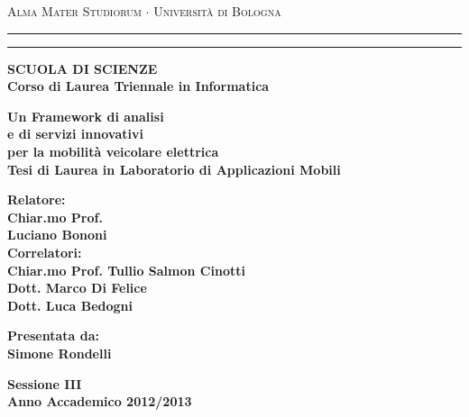  \begin{titlepage}
    \begin{center}
      {{\Large{\textsc{Alma Mater Studiorum $\cdot$ Universit\`a di Bologna}}}} \rule[0.1cm]{15.8cm}{0.1mm}
      \rule[0.5cm]{15.8cm}{0.6mm}
      {\small{\bf SCUOLA DI SCIENZE\\
      Corso di Laurea Triennale in Informatica }}
    \end{center}
    
    \vspace{15mm}
    
    \begin{center}
      {\LARGE{\bf Un Framework di analisi}}\\
      \vspace{3mm}
      {\LARGE{\bf e di servizi innovativi}}\\
	  \vspace{3mm}
      {\LARGE{\bf per la mobilità veicolare elettrica}}\\
      \vspace{15mm} 
      {\large{\bf Tesi di Laurea in Laboratorio di Applicazioni Mobili}}
    \end{center}
    
    \vspace{20mm}
    \par
    \noindent
    
    \begin{minipage}[t]{0.60\textwidth}
      {\large{\bf Relatore:\\
      Chiar.mo Prof.\\
      Luciano Bononi\newline}}\\
	{\large{\bf Correlatori:\\
	Chiar.mo Prof. Tullio Salmon Cinotti\\
	Dott. Marco Di Felice\\
	Dott. Luca Bedogni}}
    \end{minipage}
      \hfill
    \begin{minipage}[t]{0.34\textwidth}\raggedleft
    {\large{\bf Presentata da:\\
    Simone Rondelli}}  
    \end{minipage}
   \vspace{18mm}
    \begin{center}
	{\large{\bf Sessione III\\
	Anno Accademico 2012/2013}}
	\end{center}
  \end{titlepage}
  
\begin{abstract}
    Abstract \LaTeX.
    
    Abbiamo la testa rotonda 
	per pensare in tutte le direzioni. 
 
	Francis Picabia - (1922) 
\end{abstract}